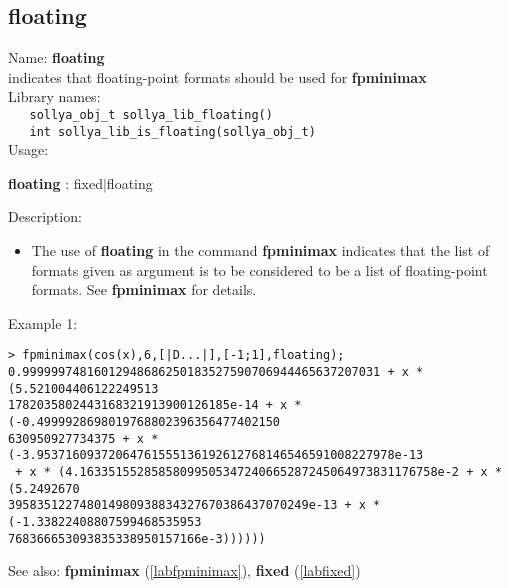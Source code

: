 \subsection{floating}
\label{labfloating}
\noindent Name: \textbf{floating}\\
\phantom{aaa}indicates that floating-point formats should be used for \textbf{fpminimax}\\[0.2cm]
\noindent Library names:\\
\verb|   sollya_obj_t sollya_lib_floating()|\\
\verb|   int sollya_lib_is_floating(sollya_obj_t)|\\[0.2cm]
\noindent Usage: 
\begin{center}
\textbf{floating} : \textsf{fixed$|$floating}\\
\end{center}
\noindent Description: \begin{itemize}

\item The use of \textbf{floating} in the command \textbf{fpminimax} indicates that the list of
   formats given as argument is to be considered to be a list of floating-point
   formats.
   See \textbf{fpminimax} for details.
\end{itemize}
\noindent Example 1: 
\begin{center}\begin{minipage}{15cm}\begin{Verbatim}[frame=single]
> fpminimax(cos(x),6,[|D...|],[-1;1],floating);
0.99999974816012948686250183527590706944465637207031 + x * (5.521004406122249513
1782035802443168321913900126185e-14 + x * (-0.4999928698019768802396356477402150
630950927734375 + x * (-3.95371609372064761555136192612768146546591008227978e-13
 + x * (4.16335155285858099505347240665287245064973831176758e-2 + x * (5.2492670
395835122748014980938834327670386437070249e-13 + x * (-1.33822408807599468535953
768366653093835338950157166e-3))))))
\end{Verbatim}
\end{minipage}\end{center}
See also: \textbf{fpminimax} (\ref{labfpminimax}), \textbf{fixed} (\ref{labfixed})
